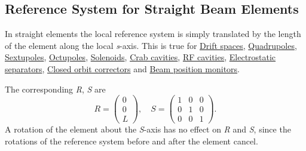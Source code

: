 \subsection{Reference System for Straight Beam Elements} 
\label{subsec:local_straight}
In straight elements the local reference system is simply translated by
the length of the element along the local \textit{s}-axis. 
This is true for  
\hyperref[sec:drift]{Drift spaces}, 
\hyperref[sec:quadrupole]{Quadrupoles}, 
\hyperref[sec:sextupole]{Sextupoles}, 
\hyperref[sec:octupole]{Octupoles}, 
\hyperref[sec:solenoid]{Solenoids}, 
\hyperref[sec:crab_cavity]{Crab cavities},
\hyperref[sec:rf_cavity]{RF cavities},
\hyperref[sec:separator]{Electrostatic separators},
\hyperref[sec:kicker]{Closed orbit correctors} and
\hyperref[sec:monitor]{Beam position monitors}.


The corresponding \textit{R}, \textit{S} are 
\begin{equation}
R =
 \begin{pmatrix}
  0 \\
  0 \\
  L
 \end{pmatrix}
, \quad
S =
 \begin{pmatrix}
  1 & 0 &  0 \\
  0 & 1 &  0 \\
  0 & 0 &  1
 \end{pmatrix}
.
\end{equation}
A rotation of the element about the \textit{S}-axis has no effect on
\textit{R} and \textit{S}, since the rotations of the reference system
before and after the element cancel.  

